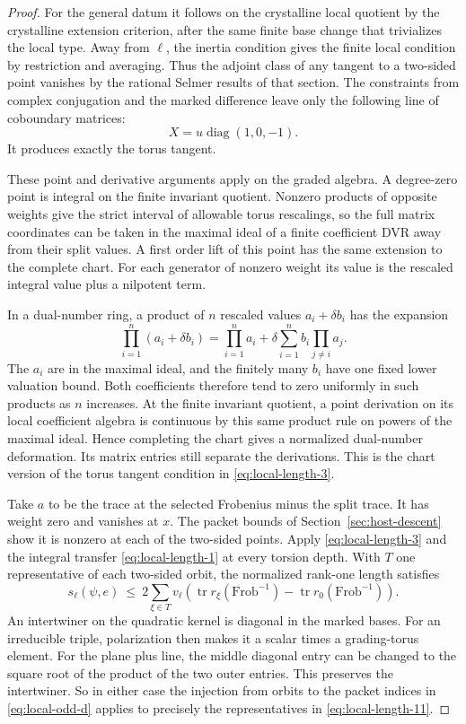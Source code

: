 \begin{proof}
For the general datum it follows on the
crystalline local quotient by the
crystalline extension criterion, after
the same finite base change that
trivializes the local type. Away from
\(\ell\), the inertia condition gives
the finite local condition by restriction
and averaging. Thus the adjoint class
of any tangent to a two-sided point
vanishes by the rational Selmer results
of that section. The constraints from complex conjugation and the marked difference leave only the following line of coboundary matrices:
\[
 X=u\operatorname{diag}(1,0,-1).
\]
It produces exactly the torus tangent.

These point and derivative arguments apply
on the graded algebra. A degree-zero
point is integral on the finite invariant
quotient. Nonzero products of opposite
weights give the strict interval of
allowable torus rescalings, so the full
matrix coordinates can be taken in the
maximal ideal of a finite coefficient
DVR away from their split values. A first
order lift of this point has the same
extension to the complete chart. For
each generator of nonzero weight its value
is the rescaled integral value plus a
nilpotent term.

In a dual-number ring, a product of \(n\) rescaled
values \(a_i+\delta b_i\) has the expansion
\[
 \prod_{i=1}^n(a_i+\delta b_i)
   =\prod_{i=1}^n a_i+
       \delta\sum_{i=1}^n b_i\!\prod_{j\ne i}a_j .
\]
The \(a_i\) are in the maximal ideal, and the finitely
many \(b_i\) have one fixed lower valuation bound. Both
coefficients therefore tend to zero uniformly in such products
as \(n\) increases. At the
finite invariant quotient, a point
derivation on its local coefficient
algebra is continuous by this same
product rule on powers of the maximal
ideal. Hence completing the chart
gives a normalized dual-number
deformation. Its matrix entries still
separate the derivations. This is the
chart version of the torus tangent
condition in \eqref{eq:local-length-3}.

Take \(a\) to be the trace at the
selected Frobenius minus the split
trace. It has weight zero and
vanishes at \(x\). The packet bounds
of Section~\ref{sec:host-descent}
show it is nonzero at each of
the two-sided points. Apply \eqref{eq:local-length-3}
and the integral transfer \eqref{eq:local-length-1} at
every torsion depth. With \(T\)
one representative of each
two-sided orbit, the normalized
rank-one length satisfies
\[
 s_\ell(\psi,e)
 \ \le\ 2\sum_{\xi\in T}
   v_\ell\!\left(\operatorname{tr}r_\xi(\mathrm{Frob}^{-1})
                  -\operatorname{tr}r_0(\mathrm{Frob}^{-1})\right).
 \tag{11}\label{eq:local-length-11}
\]
An intertwiner on the quadratic
kernel is diagonal in the marked
bases. For an irreducible triple,
polarization then makes it a scalar
times a grading-torus element.
For the plane plus line, the
middle diagonal entry can be
changed to the square root of the
product of the two outer entries.
This preserves the intertwiner.
So in either case the injection
from orbits to the packet indices
in \eqref{eq:local-odd-d} applies to precisely the
representatives in \eqref{eq:local-length-11}.


\end{proof}
